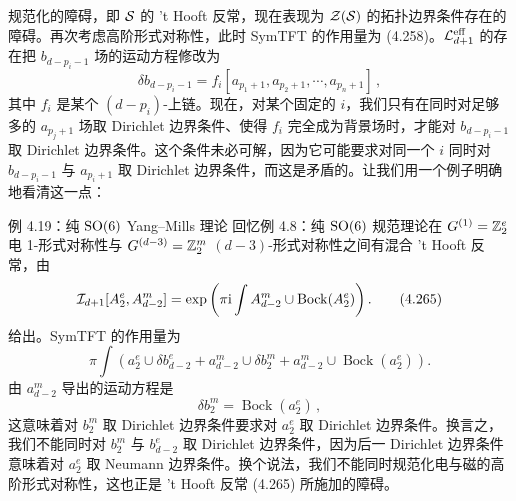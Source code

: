 
规范化的障碍，即 $\mathcal{S}$ 的 't Hooft 反常，现在表现为 $\mathcal{Z}(\mathcal{S})$ 的拓扑边界条件存在的障碍。再次考虑高阶形式对称性，此时 SymTFT 的作用量为 (4.258)。$\mathcal{L}^{\mathrm{eff}}_{d+1}$ 的存在把 $b_{d-p_i-1}$ 场的运动方程修改为
\begin{equation}
  \delta b_{d-p_i-1}=f_i[a_{p_1+1},a_{p_2+1},\cdots,a_{p_n+1}]\,, \tag{4.264}
\end{equation}
其中 $f_i$ 是某个 $(d-p_i)$-上链。现在，对某个固定的 $i$，我们只有在同时对足够多的 $a_{p_j+1}$ 场取 Dirichlet 边界条件、使得 $f_i$ 完全成为背景场时，才能对 $b_{d-p_i-1}$ 取 Dirichlet 边界条件。这个条件未必可解，因为它可能要求对同一个 $i$ 同时对 $b_{d-p_i-1}$ 与 $a_{p_i+1}$ 取 Dirichlet 边界条件，而这是矛盾的。让我们用一个例子明确地看清这一点：

\begin{examplebox}{例 4.19：纯 $\mathrm{SO}(6)$ Yang--Mills 理论}
回忆例 4.8：纯 $\mathrm{SO}(6)$ 规范理论在 $G^{(1)}=\mathbb{Z}_2^e$ 电 1-形式对称性与 $G^{(d-3)}=\mathbb{Z}_2^m$ $(d-3)$-形式对称性之间有混合 't Hooft 反常，由
\begin{equation}
  \mathcal{I}_{d+1}[A_2^e,A_{d-2}^m]=\exp\left(\pi\mathrm{i}\int A_{d-2}^m\cup\operatorname{Bock}(A_2^e)\right). \tag{4.265}
\end{equation}
给出。SymTFT 的作用量为
\begin{equation}
  \pi\int\left(a_2^e\cup\delta b_{d-2}^e+a_{d-2}^m\cup\delta b_2^m+a_{d-2}^m\cup\operatorname{Bock}(a_2^e)\right). \tag{4.266}
\end{equation}
由 $a_{d-2}^m$ 导出的运动方程是
\begin{equation}
  \delta b_2^m=\operatorname{Bock}(a_2^e)\,, \tag{4.267}
\end{equation}
这意味着对 $b_2^m$ 取 Dirichlet 边界条件要求对 $a_2^e$ 取 Dirichlet 边界条件。换言之，我们不能同时对 $b_2^m$ 与 $b_{d-2}^e$ 取 Dirichlet 边界条件，因为后一 Dirichlet 边界条件意味着对 $a_2^e$ 取 Neumann 边界条件。换个说法，我们不能同时规范化电与磁的高阶形式对称性，这也正是 't Hooft 反常 (4.265) 所施加的障碍。
\end{examplebox}


